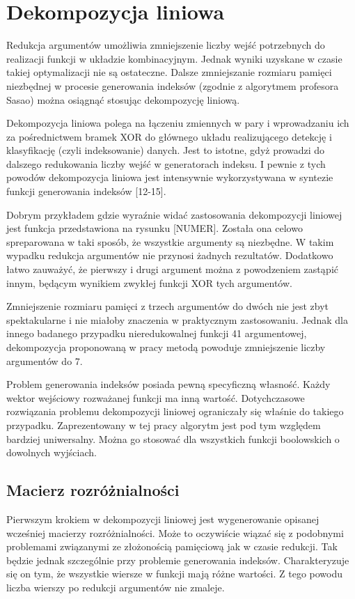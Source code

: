 \chapter{Dekompozycja liniowa}

Redukcja argumentów umożliwia zmniejszenie liczby wejść potrzebnych do realizacji funkcji w układzie kombinacyjnym.
Jednak wyniki uzyskane w czasie takiej optymalizacji nie są ostateczne.
Dalsze zmniejszanie rozmiaru pamięci niezbędnej w procesie generowania indeksów (zgodnie z algorytmem profesora Sasao) można osiągnąć stosując dekompozycję liniową.

Dekompozycja liniowa polega na  łączeniu zmiennych w pary i wprowadzaniu ich za pośrednictwem bramek XOR do głównego układu realizującego detekcję i klasyfikację (czyli indeksowanie) danych.
Jest to istotne,
gdyż prowadzi do dalszego redukowania liczby wejść w generatorach indeksu.
I pewnie z tych powodów dekompozycja liniowa jest intensywnie wykorzystywana w syntezie funkcji generowania indeksów [12-15].

Dobrym przykładem gdzie wyraźnie widać zastosowania dekompozycji liniowej jest funkcja przedstawiona na rysunku [NUMER].
Została ona celowo spreparowana w taki sposób,
że wszystkie argumenty są niezbędne.
W takim wypadku redukcja argumentów nie przynosi żadnych rezultatów.
Dodatkowo łatwo zauważyć,
że pierwszy i drugi argument można z powodzeniem zastąpić innym,
będącym wynikiem zwykłej funkcji XOR tych argumentów.

Zmniejszenie rozmiaru pamięci z trzech argumentów do dwóch nie jest zbyt spektakularne i nie miałoby znaczenia w praktycznym zastosowaniu.
Jednak dla innego badanego przypadku nieredukowalnej funkcji 41 argumentowej,
dekompozycja proponowaną w pracy metodą powoduje zmniejszenie liczby argumentów do 7.

Problem generowania indeksów posiada pewną specyficzną własność.
Każdy wektor wejściowy rozważanej funkcji ma inną wartość.
Dotychczasowe rozwiązania problemu dekompozycji liniowej ograniczały się właśnie do takiego przypadku.
Zaprezentowany w tej pracy algorytm jest pod tym względem bardziej uniwersalny.
Można go stosować dla wszystkich funkcji boolowskich o dowolnych wyjściach.

\section{Macierz rozróżnialności}

Pierwszym krokiem w dekompozycji liniowej jest wygenerowanie opisanej wcześniej macierzy rozróżnialności.
Może to oczywiście wiązać się z podobnymi problemami związanymi ze złożonością pamięciową jak w czasie redukcji.
Tak będzie jednak szczególnie przy problemie generowania indeksów.
Charakteryzuje się on tym,
że wszystkie wiersze w funkcji mają różne wartości.
Z tego powodu liczba wierszy po redukcji argumentów nie zmaleje.

